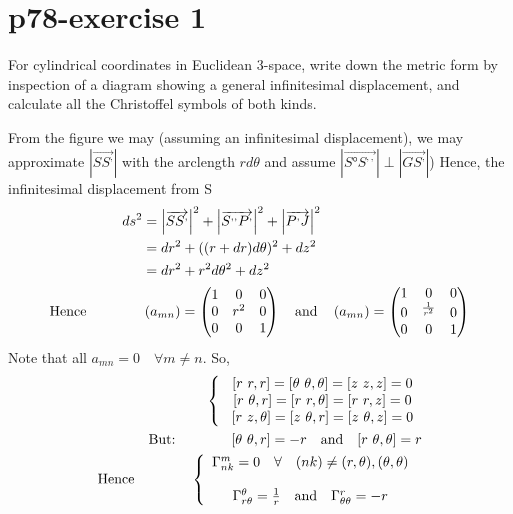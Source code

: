 \section{p78-exercise 1}
\begin{tcolorbox}
For cylindrical coordinates in Euclidean 3-space, write down the metric form by inspection of a diagram showing a general infinitesimal displacement, and calculate all the Christoffel symbols of both kinds.
\end{tcolorbox}
\begin{figure}[h]



\end{figure}
From the figure we may (assuming an infinitesimal displacement), we may approximate $\left| \overrightarrow{SS^{,}} \right|$ with the arclength $r d\theta$ and assume $\left|  \overrightarrow{S°S^{,,}} \right| \perp \left|  \overrightarrow{GS^{,}} \right|$) Hence, the infinitesimal displacement from S
\begin{align}
\ ds^2 &= \left| \overrightarrow{SS^{,}} \right|^2 + \left| \overrightarrow{S^{,,}P^{,}} \right|^2+\left| \overrightarrow{P^{,}J} \right|^2\\
\ &= dr^2 + ((r+dr)d\theta)^2 + dz^2\\
\ &= dr^2 + r^2d\theta^2 + dz^2\\
\text{Hence} \quad\quad\quad\quad &\left(a_{mn}\right) = \begin{pmatrix}
 1& 0 & 0 \\
 0&  r^2&0  \\
 0&0  &1  \\
\end{pmatrix}\quad\text{and}\quad \left(a_{mn}\right) = \begin{pmatrix}
 1& 0 & 0 \\
 0&  ^\frac{1}{r^2}&0  \\
 0&0  &1  \\
\end{pmatrix}
\end{align}
Note that all $a_{mn} = 0 \quad \forall m\ne n$. So,
\begin{align}
\left \{ \begin{array}{c}
\ [r \ r,r]=[\theta \  \theta, \theta] = [z \ z,z] = 0\\
\ [r \ \theta,r]=[r \ r, \theta] = [r \ r,z] = 0\\
\ [r \ z,\theta]=[z \  \theta, r] = [z \ \theta,z] = 0\\
\end{array}\right.\\
\text{But:}\quad\quad\quad\quad [\theta \ \theta,r]= -r \quad\text{and}\quad [r \  \theta, \theta] = r\\
\text{Hence}\quad\quad\quad\quad \left \{ \begin{array}{c}
\Gamma^m_{nk} = 0 \quad\forall\quad (nk) \ne (r, \theta), (\theta, \theta)\\\\
\Gamma^{\theta}_{r\theta} = \frac{1}{r} \quad\text{and}\quad \Gamma^r_{\theta\theta} = -r
\end{array}\right.\
\end{align}

